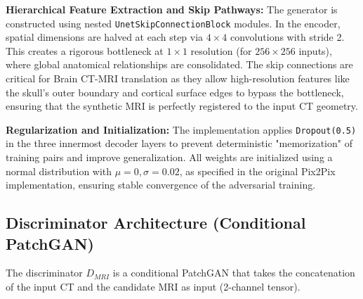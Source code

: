 \documentclass[10pt,a4paper]{article}
\begin{document}
\textbf{Hierarchical Feature Extraction and Skip Pathways:} 
The generator is constructed using nested \texttt{UnetSkipConnectionBlock} modules. In the encoder, spatial dimensions are halved at each step via $4 \times 4$ convolutions with stride 2. This creates a rigorous bottleneck at $1 \times 1$ resolution (for $256 \times 256$ inputs), where global anatomical relationships are consolidated. The skip connections are critical for Brain CT-MRI translation as they allow high-resolution features like the skull's outer boundary and cortical surface edges to bypass the bottleneck, ensuring that the synthetic MRI is perfectly registered to the input CT geometry.

\textbf{Regularization and Initialization:} 
The implementation applies \texttt{Dropout(0.5)} in the three innermost decoder layers to prevent deterministic "memorization" of training pairs and improve generalization. All weights are initialized using a normal distribution with $\mu=0, \sigma=0.02$, as specified in the original Pix2Pix implementation, ensuring stable convergence of the adversarial training.

\subsection{Discriminator Architecture (Conditional PatchGAN)}
The discriminator $D_{MRI}$ is a conditional PatchGAN that takes the concatenation of the input CT and the candidate MRI as input (2-channel tensor).
\end{document}
